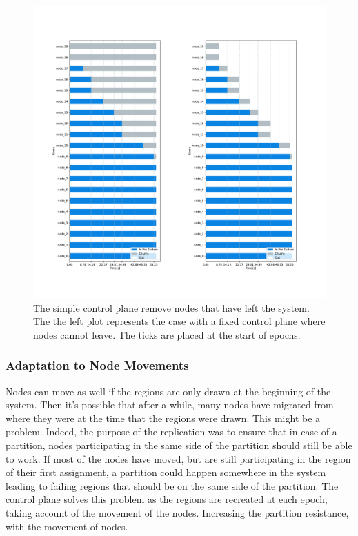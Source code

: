 \documentclass[a4paper,11pt,oneside]{report}
\begin{document}
\begin{figure}[!h] 
\centering
\includegraphics[width=450pt]{figures/ChurnSubplots}
\caption{The simple control plane remove nodes that have left the system. The
 the left plot represents the case with a fixed control plane where nodes cannot leave. The ticks are placed at the start of epochs.}
 \label{fig:churn-comparision}
\end{figure}

\subsubsection{Adaptation to Node Movements}
Nodes can move as well if the regions are only drawn at the beginning of the
system. Then it's possible that after a while, many nodes have migrated from
where they were at the time that the regions were drawn. This might be a
problem. Indeed, the purpose of the replication was to ensure that in case of a
partition, nodes participating in the same side of the partition should still
be able to work. If most of the nodes have moved, but are still participating
in the region of their first assignment, a partition could happen somewhere in
the system leading to failing regions that should be on the same side of the
partition. The control plane solves this problem as the regions are recreated at
each epoch, taking account of the movement of the nodes. Increasing the
partition resistance, with the movement of nodes.
\end{document}
